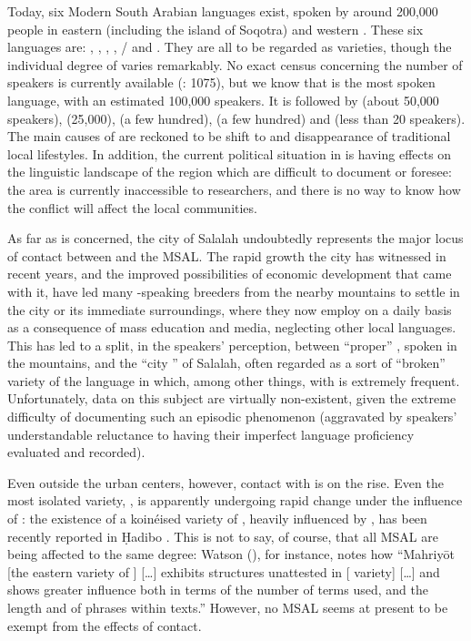 \documentclass[output=paper]{langsci/langscibook}
\begin{document}
Today, six Modern South Arabian languages exist, spoken by around 200,000 people in eastern  (including the island of Soqotra) and western . These six languages are: , , , , / and . They are all to be regarded as  varieties, though the individual degree of  varies remarkably. No exact census concerning the number of speakers is currently available (\citealt{Simeone-Senelle2011}: 1075), but we know that  is the most spoken language, with an estimated 100,000 speakers. It is followed by  (about 50,000 speakers),  (25,000),  (a few hundred),  (a few hundred) and  (less than 20 speakers). The main causes of  are reckoned to be shift to  and disappearance of traditional local lifestyles. In addition, the current political situation in  is having effects on the linguistic landscape of the region which are difficult to document or foresee: the area is currently inaccessible to researchers, and there is no way to know how the conflict will affect the local communities.

As far as  is concerned, the city of Salalah undoubtedly represents the major locus of contact between  and the MSAL. The rapid growth the city has witnessed in recent years, and the improved possibilities of economic development that came with it, have led many -speaking breeders from the nearby mountains to settle in the city or its immediate surroundings, where they now employ  on a daily basis as a consequence of mass education and media, neglecting other local languages. This has led to a split, in the speakers’ perception, between ``proper'' , spoken in the mountains, and the ``city '' of Salalah, often regarded as a sort of ``broken'' variety of the language in which, among other things,  with  is extremely frequent. Unfortunately, data on this subject are virtually non-existent, given the extreme difficulty of documenting such an episodic phenomenon (aggravated by speakers’ understandable reluctance to having their imperfect language proficiency evaluated and recorded). 

Even outside the urban centers, however, contact with  is on the rise. Even the most isolated variety, , is apparently undergoing rapid change under the influence of : the existence of a koinéised variety of , heavily influenced by , has been recently reported in Ḥadibo \citep[27]{Morris2017}. This is not to say, of course, that all MSAL are being affected to the same degree: Watson (\citeyear[3]{Watson2012}), for instance, notes how “Mahriyōt [the eastern  variety of ] […] exhibits structures unattested in  [  variety] […] and shows greater  influence both in terms of the number of  terms used, and the length and  of  phrases within texts.” However, no MSAL seems at present to be exempt from the effects of contact.
\end{document}
